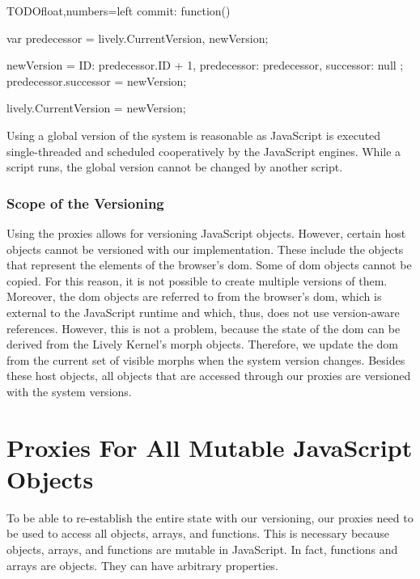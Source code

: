 \begin{code}{TODO}{float,numbers=left}
commit: function() {
    var predecessor = lively.CurrentVersion,
        newVersion;
    
    newVersion = {
        ID: predecessor.ID + 1,
        predecessor: predecessor,
        successor: null
    };
    predecessor.successor = newVersion;
    
    lively.CurrentVersion = newVersion;
}
\end{code}
\iffalse
\end{verbatim}\fi

Using a global version of the system is reasonable as JavaScript is executed single-threaded and scheduled cooperatively by the JavaScript engines.
While a script runs, the global version cannot be changed by another script.

 
\subsubsection{Scope of the Versioning} \label{subsubsec:IMPLEMENTATION:5.2.1}

Using the proxies allows for versioning JavaScript objects.
However, certain host objects cannot be versioned with our implementation.
These include the objects that represent the elements of the browser's \ac{dom}.
Some of \ac{dom} objects cannot be copied.
For this reason, it is not possible to create multiple versions of them.
Moreover, the \ac{dom} objects are referred to from the browser's \ac{dom}, which is external to the JavaScript runtime and which, thus, does not use version-aware references.
However, this is not a problem, because the state of the \ac{dom} can be derived from the Lively Kernel's morph objects.
Therefore, we update the \ac{dom} from the current set of visible morphs when the system version changes.
Besides these host objects, all objects that are accessed through our proxies are versioned with the system versions.





\section{Proxies For All Mutable JavaScript Objects}

To be able to re-establish the entire state with our versioning, our proxies need to be used to access all objects, arrays, and functions.
This is necessary because objects, arrays, and functions are mutable in JavaScript.
In fact, functions and arrays are objects.
They can have arbitrary properties.

